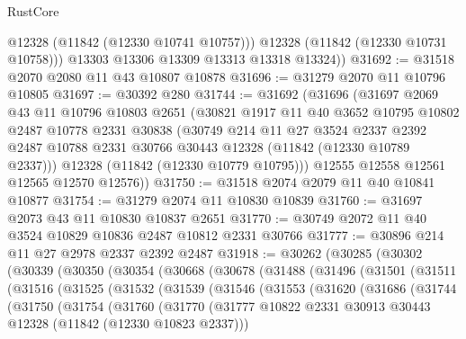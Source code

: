 \begin{lexlean}{RustCore}
\begin{coremodule}
            @12328
            (@11842 (@12330 @10741 @10757)))
          @12328
          (@11842 (@12330 @10731 @10758)))
        @13303
        @13306
        @13309
        @13313
        @13318
        @13324))
@31692 := @31518 @2070 @2080 @11 @43 @10807 @10878
@31696 := @31279 @2070 @11 @10796 @10805
@31697 := @30392 @280
@31744 := @31692
    (@31696
      (@31697
        @2069
        @43
        @11
        @10796
        @10803
        @2651
        (@30821
          @1917
          @11
          @40
          @3652
          @10795
          @10802
          @2487
          @10778
          @2331
          @30838
          (@30749
            @214
            @11
            @27
            @3524
            @2337
            @2392
            @2487
            @10788
            @2331
            @30766
            @30443
            @12328
            (@11842 (@12330 @10789 @2337)))
          @12328
          (@11842 (@12330 @10779 @10795)))
        @12555
        @12558
        @12561
        @12565
        @12570
        @12576))
@31750 := @31518 @2074 @2079 @11 @40 @10841 @10877
@31754 := @31279 @2074 @11 @10830 @10839
@31760 := @31697 @2073 @43 @11 @10830 @10837 @2651
@31770 := @30749 @2072 @11 @40 @3524 @10829 @10836 @2487 @10812 @2331 @30766
@31777 := @30896 @214 @11 @27 @2978 @2337 @2392 @2487
@31918 := @30262
    (@30285
      (@30302
        (@30339
          (@30350
            (@30354
              (@30668
                (@30678
                  (@31488
                    (@31496
                      (@31501
                        (@31511
                          (@31516
                            (@31525
                              (@31532
                                (@31539
                                  (@31546
                                    (@31553
                                      (@31620
                                        (@31686
                                          (@31744
                                            (@31750
                                              (@31754
                                                (@31760
                                                  (@31770
                                                    (@31777
                                                      @10822
                                                      @2331
                                                      @30913
                                                      @30443
                                                      @12328
                                                      (@11842 (@12330 @10823 @2337)))

\end{coremodule}
\end{lexlean}
